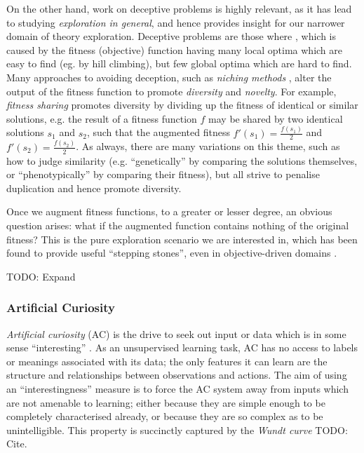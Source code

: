 \documentclass[]{article}
\begin{document}
On the other hand, work on deceptive problems is highly relevant, as it has lead to studying \emph{exploration in general}, and hence provides insight for our narrower domain of theory exploration. Deceptive problems are those where  \cite{lehman2011abandoning}, which is caused by the fitness (objective) function having many local optima which are easy to find (eg. by hill climbing), but few global optima which are hard to find. Many approaches to avoiding deception, such as \emph{niching methods} \cite{sareni1998fitness}, alter the output of the fitness function to promote \emph{diversity} and \emph{novelty}. For example, \emph{fitness sharing} promotes diversity by dividing up the fitness of identical or similar solutions, e.g. the result of a fitness function $f$ may be shared by two identical solutions $s_1$ and $s_2$, such that the augmented fitness $f'(s_1) = \frac{f(s_1)}{2}$ and $f'(s_2) = \frac{f(s_2)}{2}$. As always, there are many variations on this theme, such as how to judge similarity (e.g. ``genetically'' by comparing the solutions themselves, or ``phenotypically'' by comparing their fitness), but all strive to penalise duplication and hence promote diversity.

Once we augment fitness functions, to a greater or lesser degree, an obvious question arises: what if the augmented function contains nothing of the original fitness? This is the pure exploration scenario we are interested in, which has been found to provide useful ``stepping stones'', even in objective-driven domains \cite{lehman2011abandoning}.

TODO: Expand

\subsubsection{Artificial Curiosity}
\label{curiosity}

\emph{Artificial curiosity} (AC) is the drive to seek out input or data which is in some sense ``interesting'' \cite{schmidhuber2006developmental}. As an unsupervised learning task, AC has no access to labels or meanings associated with its data; the only features it can learn are the structure and relationships between observations and actions. The aim of using an ``interestingness'' measure is to force the AC system away from inputs which are not amenable to learning; either because they are simple enough to be completely characterised already, or because they are so complex as to be unintelligible. This property is succinctly captured by the \emph{Wundt curve} TODO: Cite.
\end{document}
